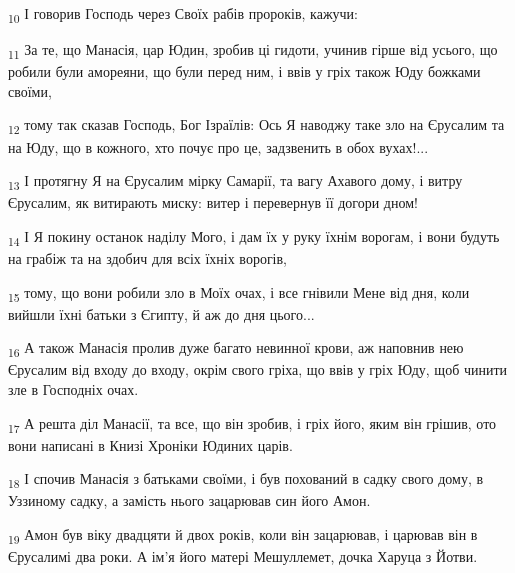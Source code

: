 \begin{tcolorbox}
\textsubscript{10} І говорив Господь через Своїх рабів пророків, кажучи:
\end{tcolorbox}
\begin{tcolorbox}
\textsubscript{11} За те, що Манасія, цар Юдин, зробив ці гидоти, учинив гірше від усього, що робили були амореяни, що були перед ним, і ввів у гріх також Юду божками своїми,
\end{tcolorbox}
\begin{tcolorbox}
\textsubscript{12} тому так сказав Господь, Бог Ізраїлів: Ось Я наводжу таке зло на Єрусалим та на Юду, що в кожного, хто почує про це, задзвенить в обох вухах!...
\end{tcolorbox}
\begin{tcolorbox}
\textsubscript{13} І протягну Я на Єрусалим мірку Самарії, та вагу Ахавого дому, і витру Єрусалим, як витирають миску: витер і перевернув її догори дном!
\end{tcolorbox}
\begin{tcolorbox}
\textsubscript{14} І Я покину останок наділу Мого, і дам їх у руку їхнім ворогам, і вони будуть на грабіж та на здобич для всіх їхніх ворогів,
\end{tcolorbox}
\begin{tcolorbox}
\textsubscript{15} тому, що вони робили зло в Моїх очах, і все гнівили Мене від дня, коли вийшли їхні батьки з Єгипту, й аж до дня цього...
\end{tcolorbox}
\begin{tcolorbox}
\textsubscript{16} А також Манасія пролив дуже багато невинної крови, аж наповнив нею Єрусалим від входу до входу, окрім свого гріха, що ввів у гріх Юду, щоб чинити зле в Господніх очах.
\end{tcolorbox}
\begin{tcolorbox}
\textsubscript{17} А решта діл Манасії, та все, що він зробив, і гріх його, яким він грішив, ото вони написані в Книзі Хроніки Юдиних царів.
\end{tcolorbox}
\begin{tcolorbox}
\textsubscript{18} І спочив Манасія з батьками своїми, і був похований в садку свого дому, в Уззиному садку, а замість нього зацарював син його Амон.
\end{tcolorbox}
\begin{tcolorbox}
\textsubscript{19} Амон був віку двадцяти й двох років, коли він зацарював, і царював він в Єрусалимі два роки. А ім'я його матері Мешуллемет, дочка Харуца з Йотви.
\end{tcolorbox}
